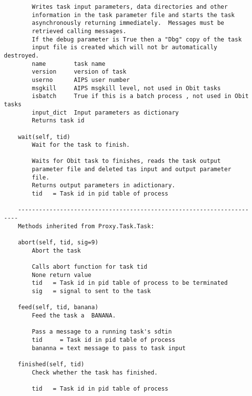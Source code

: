 \documentclass[11pt]{report}
\begin{document}
\begin{verbatim}
        Writes task input parameters, data directories and other
        information in the task parameter file and starts the task
        asynchronously returning immediately.  Messages must be
        retrieved calling messages.
        If the debug parameter is True then a "Dbg" copy of the task
        input file is created which will not br automatically destroyed.
        name        task name
        version     version of task
        userno      AIPS user number
        msgkill     AIPS msgkill level, not used in Obit tasks
        isbatch     True if this is a batch process , not used in Obit tasks
        input_dict  Input parameters as dictionary
        Returns task id
    
    wait(self, tid)
        Wait for the task to finish.
        
        Waits for Obit task to finishes, reads the task output
        parameter file and deleted tas input and output parameter
        file. 
        Returns output parameters in adictionary.
        tid   = Task id in pid table of process
    
    ----------------------------------------------------------------------
    Methods inherited from Proxy.Task.Task:
    
    abort(self, tid, sig=9)
        Abort the task
        
        Calls abort function for task tid
        None return value
        tid   = Task id in pid table of process to be terminated
        sig   = signal to sent to the task
    
    feed(self, tid, banana)
        Feed the task a  BANANA.
        
        Pass a message to a running task's sdtin
        tid     = Task id in pid table of process
        bananna = text message to pass to task input
    
    finished(self, tid)
        Check whether the task has finished.
        
        tid   = Task id in pid table of process
\end{verbatim}
\end{document}
